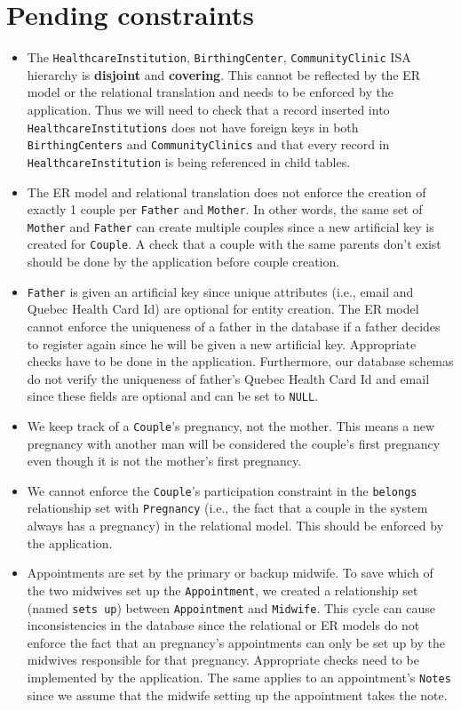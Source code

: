 \documentclass[10pt, letterpaper]{article}
\newcommand{\code}[1]{\texttt{#1}}
\begin{document}
\section{Pending constraints}
\begin{itemize}
    \item The \code{HealthcareInstitution}, \code{BirthingCenter}, \code{CommunityClinic} ISA hierarchy is \textbf{disjoint} and \textbf{covering}. This cannot be reflected by the ER model or the relational translation and needs to be enforced by the application. Thus we will need to check that a record inserted into \code{HealthcareInstitutions} does not have foreign keys in both \code{BirthingCenters} and \code{CommunityClinics} and that every record in \code{HealthcareInstitution} is being referenced in child tables.
    \item The ER model and relational translation does not enforce the creation of exactly 1 couple per \code{Father} and \code{Mother}. In other words, the same set of \code{Mother} and \code{Father} can create multiple couples since a new artificial key is created for \code{Couple}. A check that a couple with the same parents don't exist should be done by the application before couple creation.
    \item \code{Father} is given an artificial key since unique attributes (i.e., email and Quebec Health Card Id) are optional for entity creation. The ER model cannot enforce the uniqueness of a father in the database if a father decides to register again since he will be given a new artificial key. Appropriate checks have to be done in the application. Furthermore, our database schemas do not verify the uniqueness of father's Quebec Health Card Id and email since these fields are optional and can be set to \code{NULL}.
    \item We keep track of a \code{Couple}'s pregnancy, not the mother. This means a new pregnancy with another man will be considered the couple's first pregnancy even though it is not the mother's first pregnancy.
    \item We cannot enforce the \code{Couple}'s participation constraint in the \code{belongs} relationship set with \code{Pregnancy} (i.e., the fact that a couple in the system always has a pregnancy) in the relational model. This should be enforced by the application.
    \item Appointments are set by the primary or backup midwife. To save which of the two midwives set up the \code{Appointment}, we created a relationship set (named \code{sets up}) between \code{Appointment} and \code{Midwife}. This cycle can cause inconsistencies in the database since the relational or ER models do not enforce the fact that an pregnancy's appointments can only be set up by the midwives responsible for that pregnancy. Appropriate checks need to be implemented by the application. The same applies to an appointment's \code{Notes} since we assume that the midwife setting up the appointment takes the note.

\end{itemize}
\end{document}
